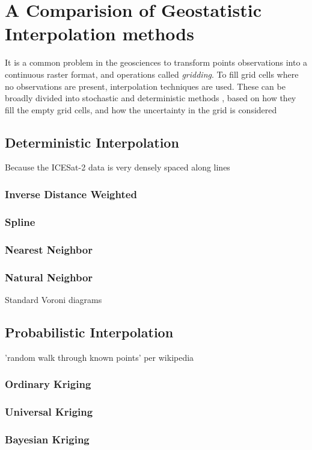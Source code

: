\chapter{A Comparision of Geostatistic Interpolation methods}
It is a common problem in the geosciences to transform points observations into a continuous raster format, and operations called \emph{gridding}. To fill grid cells where no observations are present, interpolation techniques are used. These can be broadly divided into stochastic and deterministic methods \parencite{}, based on how they fill the empty grid cells, and how the uncertainty in the grid is considered 

\section{Deterministic Interpolation}
Because the ICESat-2 data is very densely spaced along lines
\subsection{Inverse Distance Weighted}
\subsection{Spline}
\subsection{Nearest Neighbor}

\subsection{Natural Neighbor}
Standard Voroni diagrams

\section{Probabilistic Interpolation}
'random walk through known points' per wikipedia
\subsection{Ordinary Kriging}
\subsection{Universal Kriging}
\subsection{Bayesian Kriging}